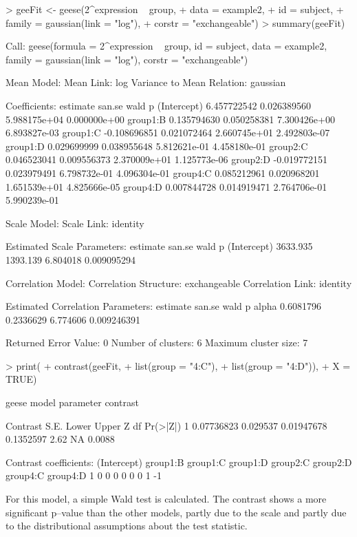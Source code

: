 \documentclass[12pt]{article}
\renewenvironment{Schunk}{\vspace{\topsep}}{\vspace{\topsep}}
\begin{document}
\begin{Schunk}
\begin{Sinput}
> geeFit <-  geese(2^expression ~ group,
+                  data = example2,
+                  id = subject,
+                  family = gaussian(link = "log"),
+                  corstr = "exchangeable")
> summary(geeFit)
\end{Sinput}
\begin{Soutput}
Call:
geese(formula = 2^expression ~ group, id = subject, data = example2, 
    family = gaussian(link = "log"), corstr = "exchangeable")

Mean Model:
 Mean Link:                 log 
 Variance to Mean Relation: gaussian 

 Coefficients:
                estimate      san.se         wald            p
(Intercept)  6.457722542 0.026389560 5.988175e+04 0.000000e+00
group1:B     0.135794630 0.050258381 7.300426e+00 6.893827e-03
group1:C    -0.108696851 0.021072464 2.660745e+01 2.492803e-07
group1:D     0.029699999 0.038955648 5.812621e-01 4.458180e-01
group2:C     0.046523041 0.009556373 2.370009e+01 1.125773e-06
group2:D    -0.019772151 0.023979491 6.798732e-01 4.096304e-01
group4:C     0.085212961 0.020968201 1.651539e+01 4.825666e-05
group4:D     0.007844728 0.014919471 2.764706e-01 5.990239e-01

Scale Model:
 Scale Link:                identity 

 Estimated Scale Parameters:
            estimate   san.se     wald           p
(Intercept) 3633.935 1393.139 6.804018 0.009095294

Correlation Model:
 Correlation Structure:     exchangeable 
 Correlation Link:          identity 

 Estimated Correlation Parameters:
       estimate    san.se     wald           p
alpha 0.6081796 0.2336629 6.774606 0.009246391

Returned Error Value:    0 
Number of clusters:   6   Maximum cluster size: 7 
\end{Soutput}
\begin{Sinput}
> print(
+       contrast(geeFit, 
+                list(group = "4:C"),
+                list(group = "4:D")),
+       X = TRUE)   
\end{Sinput}
\begin{Soutput}
geese model parameter contrast

    Contrast     S.E.      Lower     Upper    Z df Pr(>|Z|)
1 0.07736823 0.029537 0.01947678 0.1352597 2.62 NA   0.0088

Contrast coefficients:
  (Intercept) group1:B group1:C group1:D group2:C group2:D group4:C group4:D
1           0        0        0        0        0        0        1       -1
\end{Soutput}
\end{Schunk}
For this model, a simple Wald test is calculated. The contrast shows a more significant p--value than the other models, partly due to the scale and partly due to the distributional assumptions about the test statistic.
\end{document}

